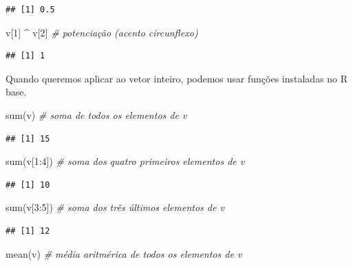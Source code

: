 \documentclass[
]{book}
\newenvironment{Shaded}{\begin{snugshade}}{\end{snugshade}}
\newcommand{\CommentTok}[1]{\textcolor[rgb]{0.56,0.35,0.01}{\textit{#1}}}
\newcommand{\DecValTok}[1]{\textcolor[rgb]{0.00,0.00,0.81}{#1}}
\newcommand{\FunctionTok}[1]{\textcolor[rgb]{0.00,0.00,0.00}{#1}}
\newcommand{\NormalTok}[1]{#1}
\newcommand{\SpecialCharTok}[1]{\textcolor[rgb]{0.00,0.00,0.00}{#1}}
\begin{document}
\begin{verbatim}
## [1] 0.5
\end{verbatim}

\begin{Shaded}
\begin{Highlighting}[]
\NormalTok{v[}\DecValTok{1}\NormalTok{] }\SpecialCharTok{\^{}}\NormalTok{ v[}\DecValTok{2}\NormalTok{] }\CommentTok{\# potenciação (acento circunflexo)}
\end{Highlighting}
\end{Shaded}

\begin{verbatim}
## [1] 1
\end{verbatim}

Quando queremos aplicar ao vetor inteiro, podemos usar funções instaladas no R base.

\begin{Shaded}
\begin{Highlighting}[]
\FunctionTok{sum}\NormalTok{(v) }\CommentTok{\# soma de todos os elementos de v}
\end{Highlighting}
\end{Shaded}

\begin{verbatim}
## [1] 15
\end{verbatim}

\begin{Shaded}
\begin{Highlighting}[]
\FunctionTok{sum}\NormalTok{(v[}\DecValTok{1}\SpecialCharTok{:}\DecValTok{4}\NormalTok{]) }\CommentTok{\# soma dos quatro primeiros elementos de v}
\end{Highlighting}
\end{Shaded}

\begin{verbatim}
## [1] 10
\end{verbatim}

\begin{Shaded}
\begin{Highlighting}[]
\FunctionTok{sum}\NormalTok{(v[}\DecValTok{3}\SpecialCharTok{:}\DecValTok{5}\NormalTok{]) }\CommentTok{\# soma dos três últimos elementos de v}
\end{Highlighting}
\end{Shaded}

\begin{verbatim}
## [1] 12
\end{verbatim}

\begin{Shaded}
\begin{Highlighting}[]
\FunctionTok{mean}\NormalTok{(v) }\CommentTok{\# média aritmérica de todos os elementos de v}
\end{Highlighting}
\end{Shaded}
\end{document}
